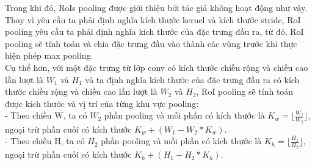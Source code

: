 {    \noindent
    Trong khi đó, RoIs pooling được giới thiệu bởi tác giả không hoạt động như vậy.
    Thay vì yêu cầu ta phải định nghĩa kích thước kernel và kích thước stride, RoI pooling yêu cầu ta phải định nghĩa kích thước của đặc trưng đầu ra, từ đó, RoI pooling sẽ tính toán và chia đặc trưng đầu vào thành các vùng trước khi thực hiện phép max pooling. \\
    Cụ thể hơn, với một đặc trưng từ lớp conv có kích thước chiều rộng và chiều cao lần lượt là ${W}_{1}$ và ${H}_{1}$ và ta định nghĩa kích thước của đặc trưng đầu ra có kích thước chiều rộng và chiều cao lần lượt là ${W}_{2}$ và ${H}_{2}$, RoI pooling sẽ tính toán được kích thước và vị trí của từng khu vực pooling: \\
    - Theo chiều W, ta có ${W}_{2}$ phần pooling và mỗi phần có kích thước là ${K}_{w} = \lfloor\frac{{W}_{1}}{{W}_{2}}\rfloor$, ngoại trừ phần cuối có kích thước ${K}_{w} + ({W}_{1} - {W}_{2} * {K}_{w})$. \\
    - Theo chiều H, ta có ${H}_{2}$ phần pooling và mỗi phần có kích thước là ${K}_{h} = \lfloor\frac{{H}_{1}}{{H}_{2}}\rfloor$, ngoại trừ phần cuối có kích thước ${K}_{h} + ({H}_{1} - {H}_{2} * {K}_{h})$. \\

}
